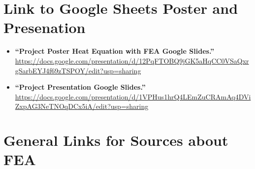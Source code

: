 \documentclass[11pt]{article}
\begin{document}
\large
\begin{center}
\end{center}

\section*{Link to Google Sheets Poster and Presenation}

\begin{itemize}
    \item \textbf{``Project Poster Heat Equation with FEA Google Slides.''} \\ 
    \url{https://docs.google.com/presentation/d/12PqFTOBQ9jGK5aHqCC0VSaQxrgSarbEYJ4f69zTSPOY/edit?usp=sharing}

     \item \textbf{``Project Presentation Google Slides.''} \\ 
    \url{https://docs.google.com/presentation/d/1VPHus1hrQ4LEmZuCRAmAq4DViZxpAG3NeTNOqDCx5iA/edit?usp=sharing}

\end{itemize}


\section*{General Links for Sources about FEA}
\end{document}
